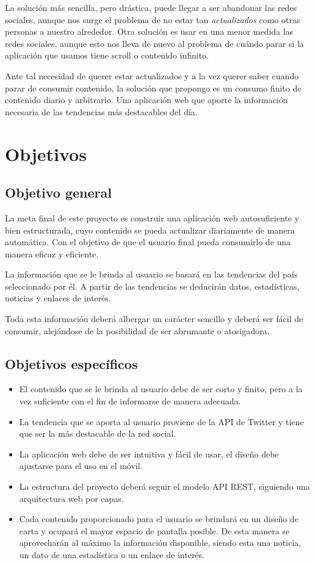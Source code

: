 La solución más sencilla, pero drástica, puede llegar a ser abandonar las redes sociales, aunque nos surge el problema de no estar tan \textit{actualizados} como otras personas a nuestro alrededor. Otra solución es usar en una menor medida las redes sociales, aunque esto nos lleva de nuevo al problema de cuándo parar si la aplicación que usamos tiene scroll o contenido infinito.

\vspace{0.3cm}

Ante tal necesidad de querer estar actualizados y a la vez querer saber cuando parar de consumir contenido, la solución que propongo es un consumo finito de contenido diario y arbitrario. Una aplicación web que aporte la información necesaria de las tendencias más destacables del día.

\section{Objetivos}

\subsection{Objetivo general}
La meta final de este proyecto es construir una aplicación web autosuficiente y bien estructurada, cuyo contenido se pueda actualizar diariamente de manera automática. Con el objetivo de que el usuario final pueda consumirlo de una manera eficaz y eficiente.

La información que se le brinda al usuario se basará en las tendencias del país seleccionado por él. A partir de las tendencias se deducirán datos, estadísticas, noticias y enlaces de interés.

Toda esta información deberá albergar un carácter sencillo y deberá ser fácil de consumir, alejándose de la posibilidad de ser abrumante o atosigadora.
\subsection{Objetivos específicos}

\begin{itemize}
\item El contenido que se le brinda al usuario debe de ser corto y finito, pero a la vez suficiente con el fin de informarse de manera adecuada.
\item La tendencia que se aporta al usuario proviene de la API de Twitter y tiene que ser la más destacable de la red social.
\item La aplicación web debe de ser intuitiva y fácil de usar, el diseño debe ajustarse para el uso en el móvil.
\item La estructura del proyecto deberá seguir el modelo API REST, siguiendo una arquitectura web por capas.
\item Cada contenido proporcionado para el usuario se brindará en un diseño de carta y ocupará el mayor espacio de pantalla posible. De esta manera se aprovecharán al máximo la información disponible, siendo esta una noticia, un dato de una estadística o un enlace de interés.
\end{itemize}

